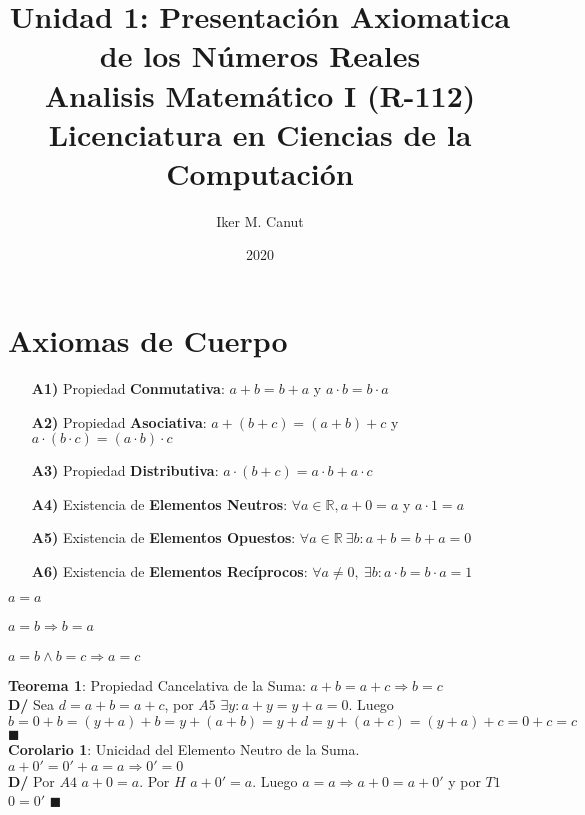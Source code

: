 \documentclass[11pt,a4paper]{article}
\author{Iker M. Canut}
\title{Unidad 1: Presentaci\'on Axiomatica de los N\'umeros Reales\\ Analisis Matem\'atico I (R-112)\\Licenciatura en Ciencias de la Computaci\'on}
\date{2020}
\newcommand*{\QEDA}{\null\nobreak\hfill\ensuremath{\blacksquare}}
\begin{document}
\maketitle
\newpage

\section{Axiomas de Cuerpo}
\begin{itemize}
\item[\textbf{A1)}] Propiedad \textbf{Conmutativa}: $a+b = b+a$ y $a \cdot b = b \cdot a$
\item[\textbf{A2)}] Propiedad \textbf{Asociativa}: $a+(b+c) = (a+b)+c$ y $a \cdot (b \cdot c) = (a \cdot b) \cdot c$
\item[\textbf{A3)}] Propiedad \textbf{Distributiva}: $a\cdot (b+c) = a\cdot b + a\cdot c$
\item[\textbf{A4)}] Existencia de \textbf{Elementos Neutros}: $\forall a \in \mathbb{R}, a+0 = a$ y $a\cdot 1 = a$
\item[\textbf{A5)}] Existencia de \textbf{Elementos Opuestos}: $\forall a \in \mathbb{R}\ \exists b : a+b = b+a = 0$
\item[\textbf{A6)}] Existencia de \textbf{Elementos Rec\'iprocos}: $\forall a \not = 0,\ \exists b : a\cdot b = b\cdot a = 1$\\
\end{itemize}
\begin{multicols}{3}
$a = a$\\ \\
$a = b \Rightarrow b = a$\\ \\
$a = b \land b = c \Rightarrow a = c$ \\
\end{multicols}

\noindent \textbf{Teorema 1}: Propiedad Cancelativa de la Suma: $a+b = a+c \Rightarrow b = c$\\
\textbf{D/} Sea $d = a + b = a + c$, por $A5$ $\exists y : a + y = y + a = 0$. Luego\\ $b = 0 + b  = (y + a) + b = y + (a + b) = y + d = y + (a + c) = (y + a) + c = 0 + c = c$ \QEDA\\

\noindent \textbf{Corolario 1}: Unicidad del Elemento Neutro de la Suma. $a+0' = 0'+a = a \Rightarrow 0' = 0$\\
\textbf{D/} Por $A4$ $a + 0 = a$. Por $H$ $a + 0' = a$. Luego $a = a \Rightarrow a + 0 = a + 0'$ y por $T1$ $0 = 0'$ \QEDA\\
\end{document}
